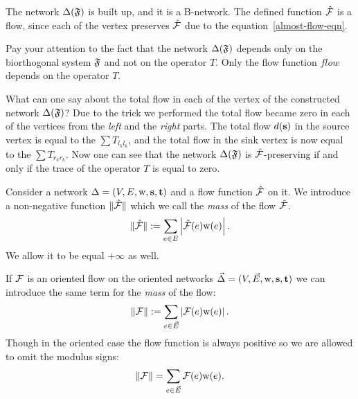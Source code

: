 \documentclass[12pt]{article}
\begin{document}
    The network $\Delta(\mathfrak{F})$ is built up, and it is a B-network.
    The defined function $\mathcal{\hat{F}}$ is a flow, since each of the vertex preserves
      $\mathcal{\hat{F}}$ due to the equation~\eqref{almost-flow-eqn}.
    \begin{remark}
      Pay your attention to the fact that the network $\Delta(\mathfrak{F})$
        depends only on the biorthogonal system $\mathfrak{F}$ and not on the operator $T$.
      Only the flow function $flow$ depends on the operator $T$.
    \end{remark}
    What can one say about the total flow in each of the vertex of the constructed network $\Delta(\mathfrak{F})$?
    Due to the trick we performed the total flow became zero in each of the vertices from the \emph{left} and the \emph{right} parts.
    The total flow $d(\mathbf{s})$ in the source vertex is equal to the $\sum T_{l_k l_k}$, and the total flow in the
      sink vertex is now equal to the $\sum T_{r_k r_k}$.
    Now one can see that the network $\Delta(\mathfrak{F})$ is $\mathcal{\hat{F}}$-preserving if and only if the trace of the operator $T$ is equal to
      zero.
    \begin{definition}
      Consider a network $\Delta = (V, E, \mathrm{w}, \mathbf{s}, \mathbf{t})$ and a flow function $\mathcal{\hat{F}}$ on it.
      We introduce a non-negative function $\|\mathcal{\hat{F}}\|$ which we call the \emph{mass} of the flow $\mathcal{\hat{F}}$.
      \[
        \|\mathcal{\hat{F}}\| := \sum_{e \in E} \left|\mathcal{\hat{F}}(e) \mathrm{w}(e)\right|.
      \]
      We allow it to be equal $+\infty$ as well.
    \end{definition}
    \begin{definition}
      If $\mathcal{F}$ is an oriented flow on the oriented networks $\vec{\Delta} = (V,\vec{E},\mathrm{w}, \mathbf{s}, \mathbf{t})$ 
        we can introduce the same term for the \emph{mass} of the flow:
      \[
        \|\mathcal{F}\| := \sum_{e \in \vec{E}} \left|\mathcal{F}(e) \mathrm{w}(e)\right|.
      \]
      Though in the oriented case the flow function is always positive
        so we are allowed to omit the modulus signs:
      \[
        \|\mathcal{F}\| = \sum_{e \in \vec{E}} \mathcal{F}(e) \mathrm{w}(e).
      \]
    \end{definition}
\end{document}
